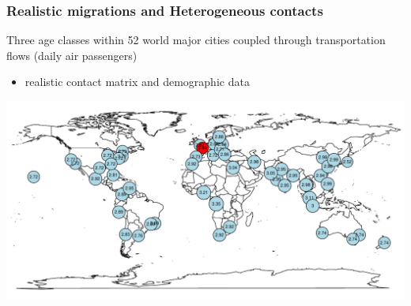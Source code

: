 \documentclass{beamer}
\begin{document}
\begin{frame}
  \frametitle{Realistic migrations  and Heterogeneous contacts}
  \alert{Three age classes} within 52 world major cities coupled through transportation flows
    (daily air passengers)
  \begin{itemize}
    \item realistic contact matrix and demographic data
  \end{itemize}
    \begin{center}
      \includegraphics[width=\textwidth]{graph/r0_mex.pdf}
    \end{center}
\end{frame}
\end{document}
